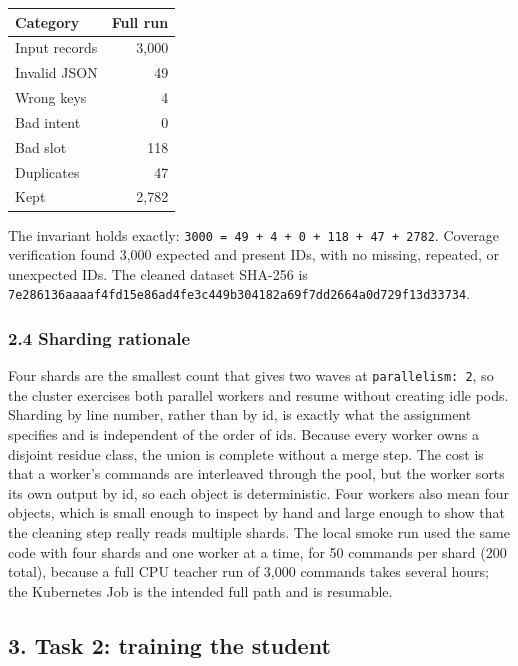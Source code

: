 \documentclass[
]{article}
\begin{document}
\begin{longtable}[]{@{}lr@{}}
\toprule\noalign{}
Category & Full run \\
\midrule\noalign{}
\endhead
\bottomrule\noalign{}
\endlastfoot
Input records & 3,000 \\
Invalid JSON & 49 \\
Wrong keys & 4 \\
Bad intent & 0 \\
Bad slot & 118 \\
Duplicates & 47 \\
Kept & 2,782 \\
\end{longtable}

The invariant holds exactly:
\texttt{3000\ =\ 49\ +\ 4\ +\ 0\ +\ 118\ +\ 47\ +\ 2782}. Coverage
verification found 3,000 expected and present IDs, with no missing,
repeated, or unexpected IDs. The cleaned dataset SHA-256 is
\texttt{7e286136aaaaf4fd15e86ad4fe3c449b304182a69f7dd2664a0d729f13d33734}.

\hypertarget{sharding-rationale}{%
\subsubsection{2.4 Sharding rationale}\label{sharding-rationale}}

Four shards are the smallest count that gives two waves at
\texttt{parallelism:\ 2}, so the cluster exercises both parallel workers
and resume without creating idle pods. Sharding by line number, rather
than by id, is exactly what the assignment specifies and is independent
of the order of ids. Because every worker owns a disjoint residue class,
the union is complete without a merge step. The cost is that a worker's
commands are interleaved through the pool, but the worker sorts its own
output by id, so each object is deterministic. Four workers also mean
four objects, which is small enough to inspect by hand and large enough
to show that the cleaning step really reads multiple shards. The local
smoke run used the same code with four shards and one worker at a time,
for 50 commands per shard (200 total), because a full CPU teacher run of
3,000 commands takes several hours; the Kubernetes Job is the intended
full path and is resumable.

\hypertarget{task-2-training-the-student}{%
\subsection{3. Task 2: training the
student}\label{task-2-training-the-student}}
\end{document}
